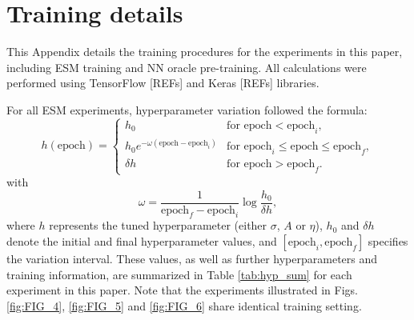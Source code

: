 



\section{Training details}\label{sec:train_det}

This Appendix details the training procedures for the experiments in this paper, including ESM training and NN oracle pre-training. All calculations were performed using TensorFlow [REFs] and Keras [REFs] libraries.

For all ESM experiments, hyperparameter variation followed the formula:
\begin{equation}
  \label{cases}
  h(\mathrm{epoch}) = \begin{cases}
    h_0 & \text{for } \mathrm{epoch} < \mathrm{epoch}_i, \\
    h_0 e^{-\omega (\mathrm{epoch} - \mathrm{epoch}_i)} & \text{for } \mathrm{epoch}_i \leq \mathrm{epoch} \leq \mathrm{epoch}_f, \\
    \delta h & \text{for } \mathrm{epoch} > \mathrm{epoch}_f.
  \end{cases}
\end{equation} 
with
\begin{equation}
  \omega = \frac{1}{\mathrm{epoch}_f - \mathrm{epoch}_i} \log{ \frac{h_0}{\delta h} },
\end{equation}
where $h$ represents the tuned hyperparameter (either $\sigma$, $A$ or $\eta$), $h_0$ and $\delta h$ denote the initial and final hyperparameter values, and $ \left[ \mathrm{epoch}_i , \mathrm{epoch}_f \right]$ specifies the variation interval. These values, as well as further hyperparameters and training information, are summarized in Table \ref{tab:hyp_sum} for each experiment in this paper. Note that the experiments illustrated in Figs. \ref{fig:FIG_4}, \ref{fig:FIG_5} and \ref{fig:FIG_6} share identical training setting.

